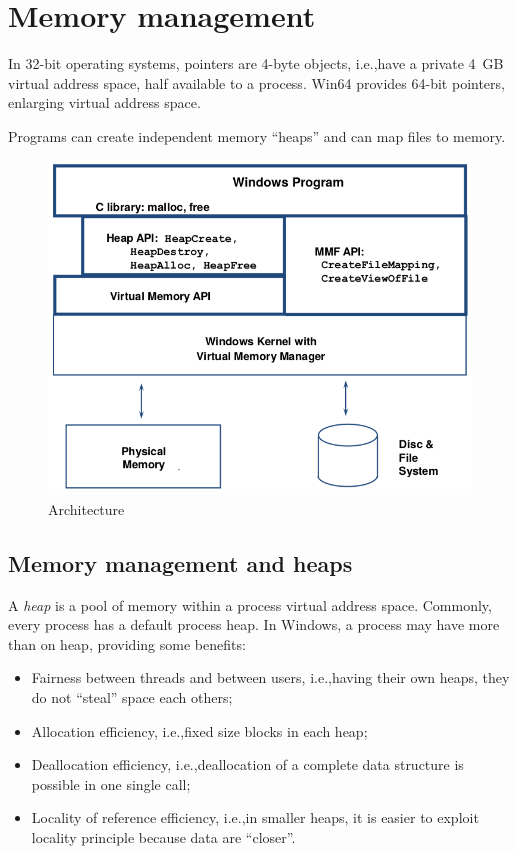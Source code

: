 \chapter{Memory management}
In 32-bit operating systems, pointers are 4-byte objects, i.e.,\@ have a private 4~GB virtual address space, half available to a process. Win64 provides 64-bit pointers, enlarging virtual address space.

Programs can create independent memory ``heaps'' and can map files to memory.

\begin{figure}[hbtp]
\centering
\includegraphics[scale=0.35]{images/windows_memory_management/architecture.png}
\caption{Architecture}
\end{figure}

\section{Memory management and heaps}
A \emph{heap} is a pool of memory within a process virtual address space. Commonly, every process has a default process heap. In Windows, a process may have more than on heap, providing some benefits:
\begin{itemize}
\item Fairness between threads and between users, i.e.,\@ having their own heaps, they do not ``steal'' space each others;
\item Allocation efficiency, i.e.,\@ fixed size blocks in each heap;
\item Deallocation efficiency, i.e.,\@ deallocation of a complete data structure is possible in one single call;
\item Locality of reference efficiency, i.e.,\@ in smaller heaps, it is easier to exploit locality principle because data are ``closer''.
\end{itemize}

